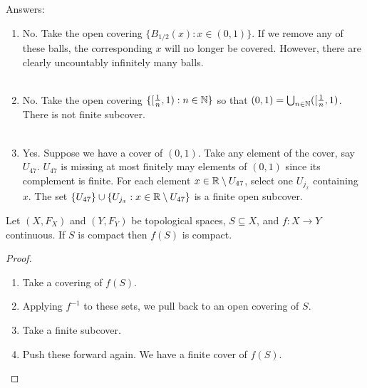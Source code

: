 Answers: 
\begin{enumerate}
	\item No. Take the open covering $\{B_{1/2}(x) : x \in (0,1)\}$. If we remove any of these balls, the corresponding $x$ will no longer be covered. However, there are clearly uncountably infinitely many balls. \\\\
	\item No. Take the open covering $\{[\frac{1}{n}, 1) : n \in \mathbb N\}$ so that $(0,1) = \bigcup_{n \in \mathbb N}([\frac{1}{n}, 1)$. There is not finite subcover. \\\\
	\item Yes. Suppose we have a cover of $(0,1)$. Take any element of the cover, say $U_{47}$. $U_{47}$ is missing at most finitely may elements of $(0,1)$ since its complement is finite. For each element $x \in \mathbb R \setminus U_{47}$, select one $U_{j_x}$ containing $x$. The set $\{U_{47}\} \cup \{U_{j_x}: x \in \mathbb R \setminus U_{47}\}$ is a finite open subcover. 
\end{enumerate}
\begin{theorem}
	 Let $(X, F_X)$ and $(Y, F_Y)$ be topological spaces, $S \subseteq X$, and $f : X \rightarrow Y$ continuous. If $S$ is compact then $f(S)$ is compact. 
\end{theorem}
\begin{proof}
	\begin{enumerate}
		\item Take a covering of $f(S)$. 
		\item Applying $f^{-1}$ to these sets, we pull back to an open covering of $S$. 
		\item Take a finite subcover. 
		\item Push these forward again. We have a finite cover of $f(S)$. 
	\end{enumerate}
\end{proof}

